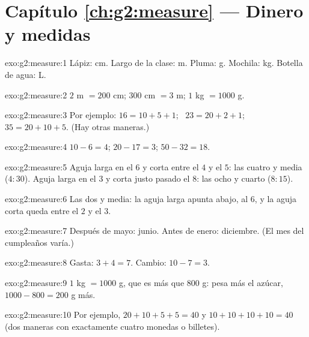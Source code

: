\section*{Capítulo \ref{ch:g2:measure} --- Dinero y medidas}

\begin{solution}{exo:g2:measure:1}
Lápiz: cm. Largo de la clase: m. Pluma: g. Mochila: kg. Botella de
agua: L.
\end{solution}

\begin{solution}{exo:g2:measure:2}
$2$ m $= 200$ cm; \quad $300$ cm $= 3$ m; \quad $1$ kg $= 1000$ g.
\end{solution}

\begin{solution}{exo:g2:measure:3}
Por ejemplo: $16 = 10 + 5 + 1$; \ $23 = 20 + 2 + 1$; \
$35 = 20 + 10 + 5$. (Hay otras maneras.)
\end{solution}

\begin{solution}{exo:g2:measure:4}
$10 - 6 = 4$; \quad $20 - 17 = 3$; \quad $50 - 32 = 18$.
\end{solution}

\begin{solution}{exo:g2:measure:5}
Aguja larga en el $6$ y corta entre el $4$ y el $5$: las cuatro y media
($4{:}30$). Aguja larga en el $3$ y corta justo pasado el $8$: las ocho y
cuarto ($8{:}15$).
\end{solution}

\begin{solution}{exo:g2:measure:6}
Las dos y media: la aguja larga apunta abajo, al $6$, y la aguja corta
queda entre el $2$ y el $3$.
\end{solution}

\begin{solution}{exo:g2:measure:7}
Después de mayo: junio. Antes de enero: diciembre. (El mes del cumpleaños varía.)
\end{solution}

\begin{solution}{exo:g2:measure:8}
Gasta: $3 + 4 = 7$. Cambio: $10 - 7 = 3$.
\end{solution}

\begin{solution}{exo:g2:measure:9}
$1$ kg $= 1000$ g, que es más que $800$ g: pesa más el azúcar,
$1000 - 800 = 200$ g más.
\end{solution}

\begin{solution}{exo:g2:measure:10}
Por ejemplo, $20 + 10 + 5 + 5 = 40$ y $10 + 10 + 10 + 10 = 40$
(dos maneras con exactamente cuatro monedas o billetes).
\end{solution}
